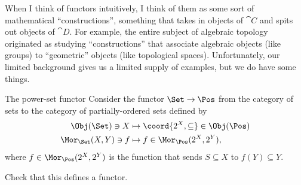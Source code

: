 When I think of functors intuitively, I think of them as some sort of mathematical ``constructions'', something that takes in objects of $\cat{C}$ and spits out objects of $\cat{D}$.  For example, the entire subject of algebraic topology originated as studying ``constructions'' that associate algebraic objects (like groups) to ``geometric'' objects (like topological spaces).  Unfortunately, our limited background gives us a limited supply of examples, but we do have some things.
\begin{exm}{The power-set functor}{}
	Consider the functor $\Set \rightarrow \Pos$ from the category of sets to the category of partially-ordered sets defined by
	\begin{subequations}
		\begin{align}
		\Obj (\Set )\ni X & \mapsto \coord{2^X,\subseteq}\in \Obj (\Pos ) \\
		\Mor _{\Set}(X,Y)\ni f & \mapsto f\in \Mor _{\Pos}(2^X,2^Y),
		\end{align}
	\end{subequations}
	where $f\in \Mor _{\Pos}(2^X,2^Y)$ is the function that sends $S\subseteq X$ to $f(Y)\subseteq Y$.
	\begin{exr}[breakable=false]{}{}
		Check that this defines a functor.
	\end{exr}
\end{exm}

